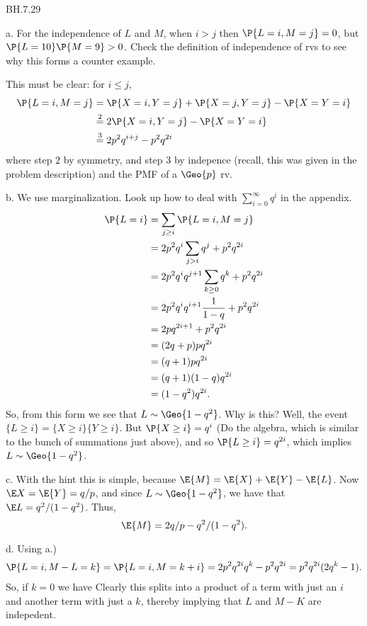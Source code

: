 
\setcounter{theorem}{28}
\begin{exercise} BH.7.29
\begin{solution}
a. For the independence of $L$ and $M$, when $i>j$ then $\P{L=i, M=j}=0$, but $\P{L=10}\P{M=9} > 0$. Check the definition of independence of rvs to see why this forms a counter example.

This must be clear: for $i\leq j$,
\begin{align*}
\P{L=i, M=j}
  &= \P{X=i, Y=j} + \P{X=j, Y=j} - \P{X=Y=i}\\
  &\stackrel{2}{=} 2\P{X=i, Y=j} - \P{X=Y=i} \\
  &\stackrel{3}{=} 2 p^{2} q^{i+j} - p^{2}q^{2i}\\
\end{align*}
where step $2$ by symmetry, and step 3 by indepence (recall, this was given in the problem description) and the PMF of a $\Geo{p}$ rv.

b. We use marginalization. Look up how to deal with $\sum_{i=0}^{\infty} q^{i}$ in the appendix.
\begin{align*}
  \P{L=i}
  &= \sum_{j\geq i} \P{L=i, M=j} \\
  &= 2p^2q^i\sum_{j> i} q^j + p^2q^{2i} \\
  &= 2p^2q^i q^{j+1}\sum_{k\geq 0} q^k + p^2q^{2i} \\
  &= 2p^2q^i q^{i+1}\frac{1}{1-q} + p^2q^{2i} \\
  &= 2p q^{2i+1} + p^2q^{2i} \\
  &= (2 q + p)pq^{2i} \\
  &= (q + 1)pq^{2i} \\
  &= (q + 1)(1-q)q^{2i} \\
  &= (1-q^{2})q^{2i}.
\end{align*}
So, from this form we see that $L\sim\Geo{1-q^{2}}$. Why is this? Well, the event $\{L\geq i\} = \{X\geq i\}\{Y\geq i\}$. But $\P{X\geq i} = q^{i}$ (Do the algebra, which is similar to the bunch of summations just above), and so $\P{L\geq i} = q^{2i}$, which implies $L\sim \Geo{1-q^{2}}$.

c. With the hint this is simple, because $\E{M} = \E{X}+\E{Y}- \E{L}$. Now $\E X = \E{Y} = q/p$, and since $L\sim \Geo{1-q^2}$, we have that $\E L = q^2/(1-q^{2})$. Thus,
\begin{equation*}
\E{M} = 2 q/ p - q^2/(1-q^2).
\end{equation*}

d. Using a.)
\begin{align*}
  \P{L=i, M-L=k} = \P{L=i, M=k+i} = 2p^2q^{2i} q^k - p^2q^{2i}=p^2q^{2i}(2q^k-1).
\end{align*}
So, if $k=0$ we have
Clearly this splits into a product of a term with just an $i$ and another term with just a $k$, thereby implying that $L$ and $M-K$ are indepedent.
\end{solution}



\end{exercise}

